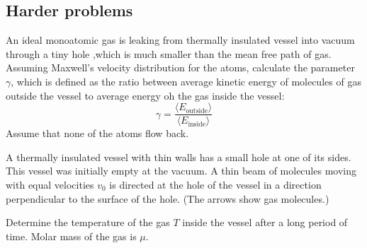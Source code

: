 \documentclass[a4paper, 12pt]{article}
\begin{document}
\subsection{Harder problems}
\begin{problem}
    An ideal monoatomic gas is leaking from thermally insulated vessel into vacuum through a tiny hole
    ,which is much smaller than the mean free path of gas. Assuming Maxwell's velocity distribution for the atoms, calculate the parameter $\gamma$, which is defined as the ratio 
    between average kinetic energy of molecules of gas outside the vessel to average energy oh the gas inside the 
    vessel: $$\gamma=\frac{\langle E_{\text{outside}}\rangle}{\langle E_{\text{inside}}\rangle}$$
    Assume that none of the atoms flow back. 
\end{problem}
\begin{problem}
    A thermally insulated vessel with thin walls  has a small hole at one of its sides. This vessel was initially empty at the vacuum.
    A thin beam of molecules moving with equal velocities $v_0$  is directed at the hole of the vessel
    in a direction perpendicular to the surface of the hole.
    (The arrows show gas molecules.)
    \begin{center}
    \end{center}
    Determine the temperature of the gas $T$ inside the vessel after a long period of time. Molar mass of the gas is $\mu$.
\end{problem}
\end{document}
